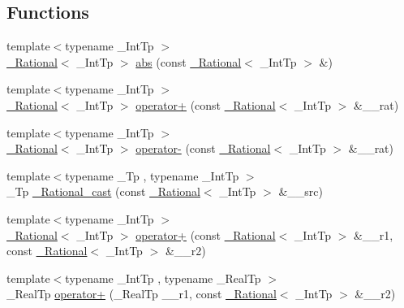 \subsection*{Functions}
\begin{DoxyCompactItemize}
\item 
{\footnotesize template$<$typename \+\_\+\+Int\+Tp $>$ }\\\hyperlink{class____gnu__cxx_1_1__Rational}{\+\_\+\+Rational}$<$ \+\_\+\+Int\+Tp $>$ \hyperlink{namespace____gnu__cxx_ab4e548de60455eb94b74c126f008263b}{abs} (const \hyperlink{class____gnu__cxx_1_1__Rational}{\+\_\+\+Rational}$<$ \+\_\+\+Int\+Tp $>$ \&)
\item 
{\footnotesize template$<$typename \+\_\+\+Int\+Tp $>$ }\\\hyperlink{class____gnu__cxx_1_1__Rational}{\+\_\+\+Rational}$<$ \+\_\+\+Int\+Tp $>$ \hyperlink{namespace____gnu__cxx_a047fc1104d5de077fecb75d5917ad254}{operator+} (const \hyperlink{class____gnu__cxx_1_1__Rational}{\+\_\+\+Rational}$<$ \+\_\+\+Int\+Tp $>$ \&\+\_\+\+\_\+rat)
\item 
{\footnotesize template$<$typename \+\_\+\+Int\+Tp $>$ }\\\hyperlink{class____gnu__cxx_1_1__Rational}{\+\_\+\+Rational}$<$ \+\_\+\+Int\+Tp $>$ \hyperlink{namespace____gnu__cxx_a955551042422a27cef4a20d46002acab}{operator-\/} (const \hyperlink{class____gnu__cxx_1_1__Rational}{\+\_\+\+Rational}$<$ \+\_\+\+Int\+Tp $>$ \&\+\_\+\+\_\+rat)
\item 
{\footnotesize template$<$typename \+\_\+\+Tp , typename \+\_\+\+Int\+Tp $>$ }\\\+\_\+\+Tp \hyperlink{namespace____gnu__cxx_a6750f8db7f8f741652ad075b941b16ff}{\+\_\+\+Rational\+\_\+cast} (const \hyperlink{class____gnu__cxx_1_1__Rational}{\+\_\+\+Rational}$<$ \+\_\+\+Int\+Tp $>$ \&\+\_\+\+\_\+src)
\item 
{\footnotesize template$<$typename \+\_\+\+Int\+Tp $>$ }\\\hyperlink{class____gnu__cxx_1_1__Rational}{\+\_\+\+Rational}$<$ \+\_\+\+Int\+Tp $>$ \hyperlink{namespace____gnu__cxx_add43b0fd2150bab3eceee13e6af6d54f}{operator+} (const \hyperlink{class____gnu__cxx_1_1__Rational}{\+\_\+\+Rational}$<$ \+\_\+\+Int\+Tp $>$ \&\+\_\+\+\_\+r1, const \hyperlink{class____gnu__cxx_1_1__Rational}{\+\_\+\+Rational}$<$ \+\_\+\+Int\+Tp $>$ \&\+\_\+\+\_\+r2)
\item 
{\footnotesize template$<$typename \+\_\+\+Int\+Tp , typename \+\_\+\+Real\+Tp $>$ }\\\+\_\+\+Real\+Tp \hyperlink{namespace____gnu__cxx_a2e92d3f8483689a453a81317d31bc73e}{operator+} (\+\_\+\+Real\+Tp \+\_\+\+\_\+r1, const \hyperlink{class____gnu__cxx_1_1__Rational}{\+\_\+\+Rational}$<$ \+\_\+\+Int\+Tp $>$ \&\+\_\+\+\_\+r2)

\end{DoxyCompactItemize}
